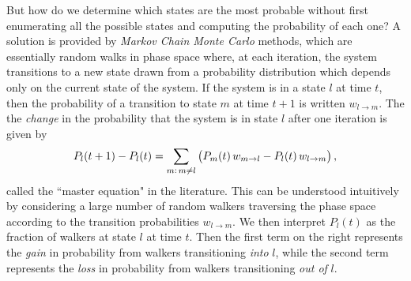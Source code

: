 But how do we determine which states are the most probable without first
enumerating all the possible states and computing the probability of each one?
A solution is provided by \emph{Markov Chain Monte Carlo} methods, which are
essentially random walks in phase space where, at each iteration, the system
transitions to a new state drawn from a probability distribution which depends
only on the current state of the system. If the system is in a state $l$ at
time $t$, then the probability of a transition to state $m$ at time $t+1$ is
written $w_{l \to m}$. The the \emph{change} in the probability that the system
is in state $l$ after one iteration is given by
\begin{equation}
  P_l(t+1) - P_l(t)
  = \sum_{m:\,m \neq l} \left(
    P_m(t) \, w_{m \to l} -
    P_l(t) \, w_{l \to m}
  \right),
  \label{eq:master-eq}
\end{equation}
called the ``master equation" in the literature. This can be understood
intuitively by considering a large number of random walkers traversing the
phase space according to the transition probabilities $w_{l \to m}$. We then
interpret $P_l(t)$ as the fraction of walkers at state $l$ at time $t$. Then
the first term on the right represents the \emph{gain} in probability from
walkers transitioning \emph{into} $l$, while the second term represents the
\emph{loss} in probability from walkers transitioning \emph{out of} $l$.

